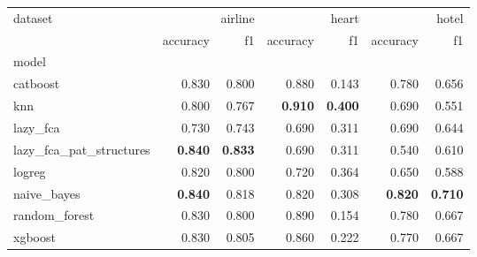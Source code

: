 \begin{tabular}{lrrrrrr}
dataset & \multicolumn{2}{r}{airline} & \multicolumn{2}{r}{heart} & \multicolumn{2}{r}{hotel} \\
 & accuracy & f1 & accuracy & f1 & accuracy & f1 \\
model &  &  &  &  &  &  \\
catboost & 0.830 & 0.800 & 0.880 & 0.143 & 0.780 & 0.656 \\
knn & 0.800 & 0.767 & \textbf{0.910} & \textbf{0.400} & 0.690 & 0.551 \\
lazy_fca & 0.730 & 0.743 & 0.690 & 0.311 & 0.690 & 0.644 \\
lazy_fca_pat_structures & \textbf{0.840} & \textbf{0.833} & 0.690 & 0.311 & 0.540 & 0.610 \\
logreg & 0.820 & 0.800 & 0.720 & 0.364 & 0.650 & 0.588 \\
naive_bayes & \textbf{0.840} & 0.818 & 0.820 & 0.308 & \textbf{0.820} & \textbf{0.710} \\
random_forest & 0.830 & 0.800 & 0.890 & 0.154 & 0.780 & 0.667 \\
xgboost & 0.830 & 0.805 & 0.860 & 0.222 & 0.770 & 0.667 \\
\end{tabular}
